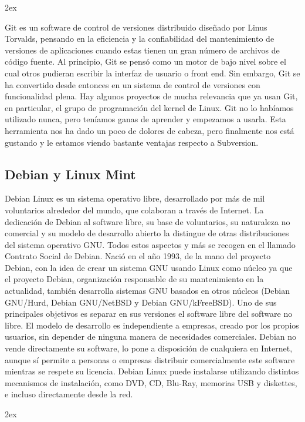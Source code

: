 \documentclass[12pt,a4paper]{report}
\begin{document}
\parskip 2ex

Git es un software de control de versiones distribuido diseñado por Linus 
Torvalds, pensando en la eficiencia y la confiabilidad del mantenimiento de
versiones de aplicaciones cuando estas tienen un gran número de archivos de 
código fuente. Al principio, Git se pensó como un motor de bajo nivel sobre el
cual otros pudieran escribir la interfaz de usuario o front end. Sin embargo, 
Git se ha convertido desde entonces en un sistema de control de versiones con 
funcionalidad plena. Hay algunos proyectos de mucha relevancia que ya usan Git, 
en particular, el grupo de programación del kernel de Linux.
Git no lo habíamos utilizado nunca, pero teníamos ganas de aprender y empezamos
a usarla. Esta herramienta nos ha dado un poco de dolores de cabeza, pero
finalmente nos está gustando y le estamos viendo bastante ventajas respecto a
Subversion. 

\subsection{Debian y Linux Mint}

Debian Linux es un sistema operativo libre, desarrollado por más de mil
voluntarios alrededor del mundo, que colaboran a través de Internet.
La dedicación de Debian al software libre, su base de voluntarios, su naturaleza
no comercial y su modelo de desarrollo abierto la distingue de otras
distribuciones del sistema operativo GNU. Todos estos aspectos y más se recogen
en el llamado Contrato Social de Debian.
Nació en el año 1993, de la mano del proyecto Debian, con la idea de crear un
sistema GNU usando Linux como núcleo ya que el proyecto Debian, organización
responsable de su mantenimiento en la actualidad, también desarrolla sistemas
GNU basados en otros núcleos (Debian GNU/Hurd, Debian GNU/NetBSD y Debian
GNU/kFreeBSD).
Uno de sus principales objetivos es separar en sus versiones el software libre
del software no libre. El modelo de desarrollo es independiente a empresas,
creado por los propios usuarios, sin depender de ninguna manera de necesidades
comerciales. Debian no vende directamente su software, lo pone a disposición de
cualquiera en Internet, aunque sí permite a personas o empresas distribuir
comercialmente este software mientras se respete su licencia.
Debian Linux puede instalarse utilizando distintos mecanismos de instalación,
como DVD, CD, Blu-Ray, memorias USB y diskettes, e incluso directamente desde la
red.

\parskip 2ex
\end{document}
